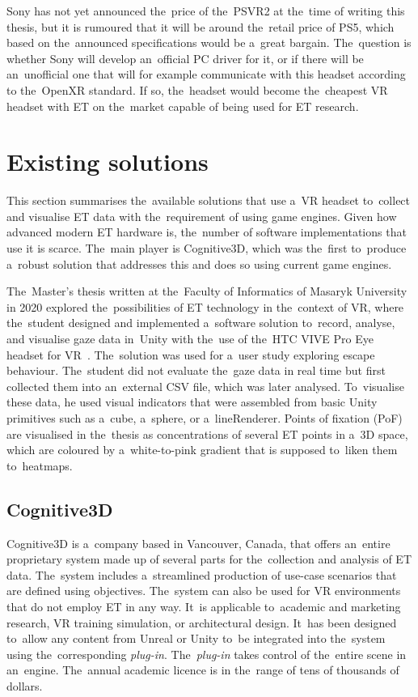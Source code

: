 Sony has not yet announced the~price of the~PSVR2 at the~time of writing this thesis, but it is rumoured that it will be around the~retail price of PS5, which based on the~announced specifications would be a~great bargain. The~question is whether Sony will develop an~official PC driver for it, or if there will be an~unofficial one that will for example communicate with this headset according to the~OpenXR standard. If so, the~headset would become the~cheapest VR headset with ET on the~market capable of being used for ET research.

\section{Existing solutions}
\label{sec:solutions}

This section summarises the~available solutions that use a~VR headset to~collect and visualise ET data with the~requirement of using game engines. Given how advanced modern ET hardware is, the~number of software implementations that use it is scarce. The~main player is Cognitive3D, which was the~first to~produce a~robust solution that addresses this and does so using current game engines.

The~Master's thesis written at the~Faculty of Informatics of Masaryk University in 2020 explored the~possibilities of ET technology in the~context of VR, where the~student designed and implemented a~software solution to~record, analyse, and visualise gaze data in~Unity with the~use of the~HTC VIVE Pro Eye headset for VR~\cite{ugwitz2020thesis}. The~solution was used for a~user study exploring escape behaviour. The~student did not evaluate the~gaze data in real time but first collected them into an~external CSV file, which was later analysed. To~visualise these data, he used visual indicators that were assembled from basic Unity primitives such as a~cube, a~sphere, or a~lineRenderer. Points of fixation (PoF) are visualised in the~thesis as concentrations of several ET points in a~3D space, which are coloured by a~white-to-pink gradient that is supposed to~liken them to~heatmaps.

\subsection{Cognitive3D}
Cognitive3D is a~company based in Vancouver, Canada, that offers an~entire proprietary system made up of several parts for the~collection and analysis of ET data. The~system includes a~streamlined production of use-case scenarios that are defined using objectives. The~system can also be used for VR environments that do not employ ET in any way. It~is applicable to~academic and marketing research, VR training simulation, or architectural design. It~has been designed to~allow any content from Unreal or Unity to~be integrated into the~system using the~corresponding \emph{plug-in}. The~\emph{plug-in} takes control of the~entire scene in an~engine. The~annual academic licence is in the~range of tens of thousands of dollars.~\cite{cognitive3d-splash, cognitive3d-meeting}

